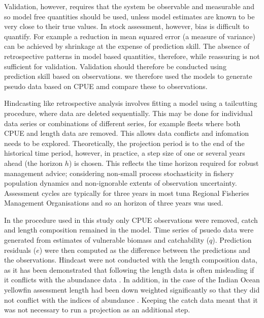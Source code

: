 \documentclass[12pt,halfline,a4paper,nonumbib]{ouparticle}
\begin{document}
Validation, however, requires that the system be observable and measurable and so model free quantities should be used, unless model estimates are known to be very close to their true values. In stock assessment, however, bias is difficult to quantify. For example a reduction in mean squared error (a measure of variance) can be achieved by shrinkage at the expense of prediction skill. The absence of retrospective patterns in model based quantities, therefore, while reassuring is not sufficient for validation. Validation should therefore be conducted using prediction skill based on observations. we therefore used the models to generate pseudo data based on CPUE amd compare these to observations. 

Hindcasting like retrospective analysis involves fitting a model using a tailcutting procedure, where data are deleted sequentially. This may be done for individual data series or combinations of different series, for example fleets where both CPUE and length data are removed. This allows data conflicts and infomation needs to be explored. Theoretically, the projection period is to the end of the historical time period, however, in practice, a step size of one or several years ahead (the horizon $h$) is chosen. This reflects the time horizon required for robust management advice; considering non-small process stochasticity in fishery population dynamics and non-ignorable extents of observation uncertainty. 
Assessment cycles are typically for three years in most tuna Regional Fisheries Management Organisations and so an horizon of three years was used.

In the procedure used in this study only CPUE observations were removed, catch and length composition remained in the model. Time series of psuedo data were generated from estimates of vulnerable biomass and catchability ($q$). Prediction residuals ($e$) were then computed as the difference between the predictions and the observations. Hindcast were not conducted with the length composition data, as it has been demonstrated that following the length data is often misleading if it conflicts with the abundance data \parencite{francis2011data}. In addition, in the case of the Indian Ocean yellowfin assessment length had been down weighted significantly so that they did not conflict with the indices of abundance \parencite{fu2018yft}. Keeping the catch data meant that it was not necessary to run a projection as an additional step.
\end{document}
